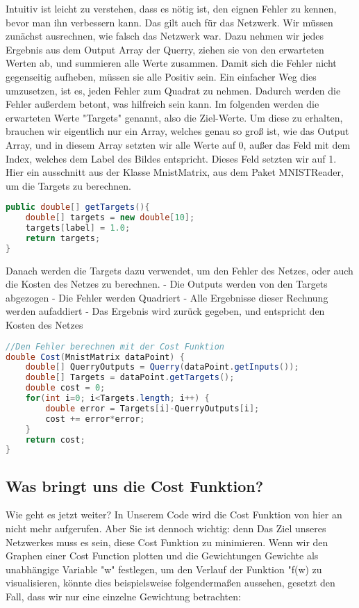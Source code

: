 \documentclass[12pt]{article}
\begin{document}
Intuitiv ist leicht zu verstehen, dass es nötig ist, den eignen Fehler zu kennen, bevor man ihn verbessern kann. Das gilt auch für das Netzwerk. Wir müssen zunächst ausrechnen, wie falsch das Netzwerk war. Dazu nehmen wir jedes Ergebnis aus dem Output Array der Querry, ziehen sie von den erwarteten Werten ab, und summieren alle Werte zusammen. Damit sich die Fehler nicht gegenseitig aufheben, müssen sie alle Positiv sein. Ein einfacher Weg dies umzusetzen, ist es, jeden Fehler zum Quadrat zu nehmen. Dadurch werden die Fehler außerdem betont, was hilfreich sein kann. Im folgenden werden die erwarteten Werte "Targets" genannt, also die Ziel-Werte. Um diese zu erhalten, brauchen wir eigentlich nur ein Array, welches genau so groß ist, wie das Output Array, und in diesem Array setzten wir alle Werte auf 0, außer das Feld mit dem Index, welches dem Label des Bildes entspricht. Dieses Feld setzten wir auf 1. Hier ein ausschnitt aus der Klasse MnistMatrix, aus dem Paket MNISTReader, um die Targets zu berechnen.\begin{lstlisting}[language=Java]
public double[] getTargets(){
    double[] targets = new double[10];
    targets[label] = 1.0;
    return targets;
} 
\end{lstlisting}
Danach werden die Targets dazu verwendet, um den Fehler des Netzes, oder auch die Kosten des Netzes zu berechnen. 
- Die Outputs werden von den Targets abgezogen
- Die Fehler werden Quadriert
- Alle Ergebnisse dieser Rechnung werden aufaddiert
- Das Ergebnis wird zurück gegeben, und entspricht den Kosten des Netzes\begin{lstlisting}[language=Java]
//Den Fehler berechnen mit der Cost Funktion
double Cost(MnistMatrix dataPoint) {
    double[] QuerryOutputs = Querry(dataPoint.getInputs());
    double[] Targets = dataPoint.getTargets();
    double cost = 0;
    for(int i=0; i<Targets.length; i++) {
        double error = Targets[i]-QuerryOutputs[i];
        cost += error*error;
    }
    return cost;
}
\end{lstlisting}\subsection{ Was bringt uns die Cost Funktion?}Wie geht es jetzt weiter? In Unserem Code wird die Cost Funktion von hier an nicht mehr aufgerufen. Aber Sie ist dennoch wichtig: denn Das Ziel unseres Netzwerkes muss es sein, diese Cost Funktion zu minimieren. Wenn wir den Graphen einer Cost Function plotten und die Gewichtungen Gewichte als unabhängige Variable "w" festlegen, um den Verlauf der Funktion "f(w) zu visualisieren, könnte dies beispielsweise folgendermaßen aussehen, gesetzt den Fall, dass wir nur eine einzelne Gewichtung betrachten:
\end{document}
